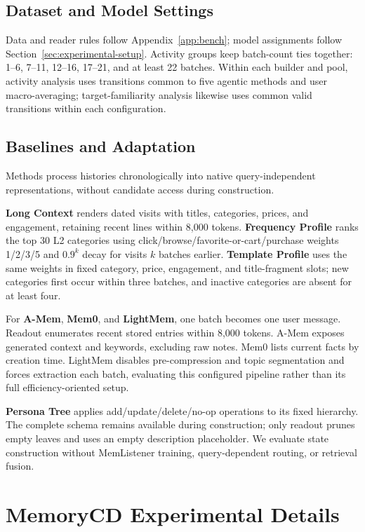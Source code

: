 \documentclass[sigconf,nonacm,balance=false]{acmart}
\begin{document}
\subsection{Dataset and Model Settings}
\label{app:bmb-dataset}
Data and reader rules follow Appendix~\ref{app:bench}; model assignments follow Section~\ref{sec:experimental-setup}. Activity groups keep batch-count ties together: 1--6, 7--11, 12--16, 17--21, and at least 22 batches. Within each builder and pool, activity analysis uses transitions common to five agentic methods and user macro-averaging; target-familiarity analysis likewise uses common valid transitions within each configuration.

\subsection{Baselines and Adaptation}
\label{app:bmb-baselines}
Methods process histories chronologically into native query-independent representations, without candidate access during construction.

\textbf{Long Context} renders dated visits with titles, categories, prices, and engagement, retaining recent lines within 8{,}000 tokens. \textbf{Frequency Profile} ranks the top 30 L2 categories using click/browse/favorite-or-cart/purchase weights 1/2/3/5 and $0.9^k$ decay for visits $k$ batches earlier. \textbf{Template Profile} uses the same weights in fixed category, price, engagement, and title-fragment slots; new categories first occur within three batches, and inactive categories are absent for at least four.

For \textbf{A-Mem}, \textbf{Mem0}, and \textbf{LightMem}, one batch becomes one user message. Readout enumerates recent stored entries within 8{,}000 tokens. A-Mem exposes generated context and keywords, excluding raw notes. Mem0 lists current facts by creation time. LightMem disables pre-compression and topic segmentation and forces extraction each batch, evaluating this configured pipeline rather than its full efficiency-oriented setup.

\textbf{Persona Tree} applies add/update/delete/no-op operations to its fixed hierarchy. The complete schema remains available during construction; only readout prunes empty leaves and uses an empty description placeholder. We evaluate state construction without MemListener training, query-dependent routing, or retrieval fusion.

\section{MemoryCD Experimental Details}
\label{app:exp-memorycd}
\end{document}
